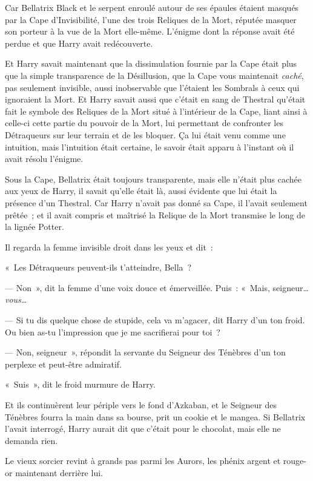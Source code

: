 Car Bellatrix Black et le serpent enroulé autour de ses épaules étaient masqués par la Cape d'Invisibilité, l'une des trois Reliques de la Mort, réputée masquer son porteur à la vue de la Mort elle-même.
L'énigme dont la réponse avait été perdue et que Harry avait redécouverte.

Et Harry savait maintenant que la dissimulation fournie par la Cape était plus que la simple transparence de la Désillusion, que la Cape vous maintenait \emph{caché}, pas seulement invisible, aussi inobservable que l'étaient les Sombrals à ceux qui ignoraient la Mort.
Et Harry savait aussi que c'était en sang de Thestral qu'était fait le symbole des Reliques de la Mort situé à l'intérieur de la Cape, liant ainsi à celle-ci cette partie du pouvoir de la Mort, lui permettant de confronter les Détraqueurs sur leur terrain et de les bloquer.
Ça lui était venu comme une intuition, mais l'intuition était certaine, le savoir était apparu à l'instant où il avait résolu l'énigme.

Sous la Cape, Bellatrix était toujours transparente, mais elle n'était plus cachée aux yeux de Harry, il savait qu'elle était là, aussi évidente que lui était la présence d'un Thestral.
Car Harry n'avait pas donné sa Cape, il l'avait seulement prêtée~; et il avait compris et maîtrisé la Relique de la Mort transmise le long de la lignée Potter.

Il regarda la femme invisible droit dans les yeux et dit~:

«~Les Détraqueurs peuvent-ils t'atteindre, Bella~?

--- Non~», dit la femme d'une voix douce et émerveillée.
Puis~: «~Mais, seigneur…
\emph{vous…}

--- Si tu dis quelque chose de stupide, cela va m'agacer, dit Harry d'un ton froid.
Ou bien as-tu l'impression que je me sacrifierai pour toi~?

--- Non, seigneur~», répondit la servante du Seigneur des Ténèbres d'un ton perplexe et peut-être admiratif.

«~Suis~», dit le froid murmure de Harry.

Et ils continuèrent leur périple vers le fond d'Azkaban, et le Seigneur des Ténèbres fourra la main dans sa bourse, prit un cookie et le mangea.
Si Bellatrix l'avait interrogé, Harry aurait dit que c'était pour le chocolat, mais elle ne demanda rien.

\later

Le vieux sorcier revint à grands pas parmi les Aurors, les phénix argent et rouge-or maintenant derrière lui.

